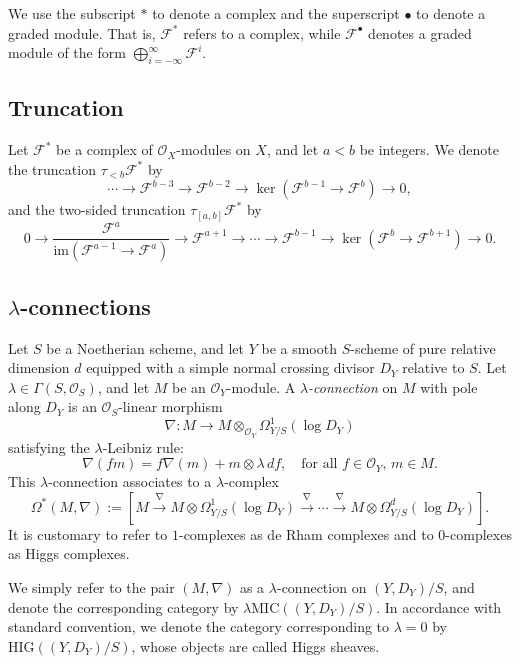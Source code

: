 \documentclass[12pt, a4paper]{article}
\begin{document}
 We use the subscript $*$ to denote a complex and the superscript $\bullet$ to denote a graded module. That is, $\mathcal{F}^*$ refers to a complex, while $\mathcal{F}^\bullet$ denotes a graded module of the form $\bigoplus_{i = -\infty}^{\infty} \mathcal{F}^i$.

\subsection{Truncation}

Let \( \mathcal{F}^* \) be a complex of \( \mathcal{O}_X \)-modules on \( X \), and let \( a < b \) be integers.  
We denote the truncation \( \tau_{<b} \mathcal{F}^* \) by
\[
\cdots \longrightarrow \mathcal{F}^{b-3} \longrightarrow \mathcal{F}^{b-2} \longrightarrow \ker\left( \mathcal{F}^{b-1} \to \mathcal{F}^b \right) \longrightarrow 0,
\]
and the two-sided truncation \( \tau_{[a,b]} \mathcal{F}^* \) by
\[
0 \longrightarrow \frac{\mathcal{F}^a}{\mathrm{im}(\mathcal{F}^{a-1} \to \mathcal{F}^a)} 
\longrightarrow \mathcal{F}^{a+1} \longrightarrow \cdots \longrightarrow \mathcal{F}^{b-1} 
\longrightarrow \ker(\mathcal{F}^b \to \mathcal{F}^{b+1}) \longrightarrow 0.
\]


\subsection{$\lambda$-connections}
Let $S$ be a Noetherian scheme, and let $Y$ be a smooth $S$-scheme of pure relative dimension $d$ equipped with a simple normal crossing divisor $D_Y$ relative to $S$. Let $\lambda \in \Gamma(S, \mathcal{O}_S)$, and let $M$ be an $\mathcal{O}_Y$-module.
A \emph{$\lambda$-connection} on $M$ with pole along $D_Y$ is an $\mathcal{O}_S$-linear morphism
\[
\nabla \colon M \to M \otimes_{\mathcal{O}_Y} \Omega^1_{Y/S}(\log D_Y)
\]
satisfying the $\lambda$-Leibniz rule:
\[
\nabla(fm) = f \nabla(m) + m \otimes \lambda \, df, \quad \text{for all } f \in \mathcal{O}_Y,\, m \in M.
\]
This $\lambda$-connection associates to a $\lambda$-complex
$$
\Omega^*(M,\nabla):=[M\xrightarrow{\nabla}M\otimes\Omega^1_{Y/S}(\log D_Y)\xrightarrow{\nabla}\cdots\xrightarrow{\nabla}M\otimes\Omega^d_{Y/S}(\log D_Y)].
$$
It is customary to refer to $1$-complexes as de Rham complexes and to $0$-complexes as Higgs complexes.


We simply refer to the pair $(M, \nabla)$ as a $\lambda$-connection on $(Y, D_Y)/S$, and denote the corresponding category by $\lambda\mathrm{MIC}((Y, D_Y)/S)$. In accordance with standard convention, we denote the category corresponding to $\lambda = 0$ by $\mathrm{HIG}((Y, D_Y)/S)$, whose objects are called Higgs sheaves.
\end{document}
